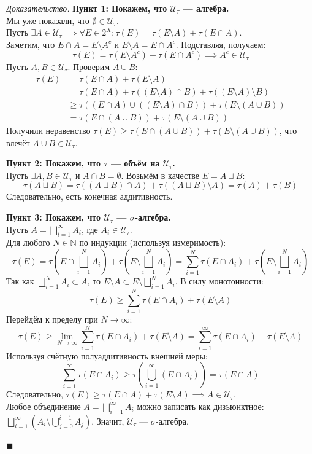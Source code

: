 \documentclass[12pt,a4paper]{article}
\newenvironment{Proof}[1][Доказательство]{\vspace{0.5em}\noindent\textit{#1.}\hspace{0.5em}\ignorespaces}{\hfill$\blacksquare$\vspace{1em}}
\begin{document}
\begin{Proof}
\textbf{Пункт 1: Покажем, что $\mathcal{U}_\tau$ — алгебра.} \\
Мы уже показали, что $\emptyset \in \mathcal{U}_\tau$. \\
Пусть $\exists A \in \mathcal{U}_\tau \implies \forall E \in 2^X: \tau(E) = \tau(E \setminus A) + \tau(E \cap A)$. \\
Заметим, что $E \cap A = E \setminus A^c$ и $E \setminus A = E \cap A^c$. Подставляя, получаем:
$$ \tau(E) = \tau(E \setminus A^c) + \tau(E \cap A^c) \implies A^c \in \mathcal{U}_\tau $$
Пусть $A, B \in \mathcal{U}_\tau$. Проверим $A \cup B$:
\begin{align*}
    \tau(E) &= \tau(E \cap A) + \tau(E \setminus A) \\
    &= \tau(E \cap A) + \tau((E \setminus A) \cap B) + \tau((E \setminus A) \setminus B) \\
    &\ge \tau((E \cap A) \cup ((E \setminus A) \cap B)) + \tau(E \setminus (A \cup B)) \\
    &= \tau(E \cap (A \cup B)) + \tau(E \setminus (A \cup B))
\end{align*}
Получили неравенство $\tau(E) \ge \tau(E \cap (A \cup B)) + \tau(E \setminus (A \cup B))$, что влечёт $A \cup B \in \mathcal{U}_\tau$.

\textbf{Пункт 2: Покажем, что $\tau$ — объём на $\mathcal{U}_\tau$.} \\
Пусть $\exists A, B \in \mathcal{U}_\tau$ и $A \cap B = \emptyset$. Возьмём в качестве $E = A \sqcup B$:
$$ \tau(A \sqcup B) = \tau((A \sqcup B) \cap A) + \tau((A \sqcup B) \setminus A) = \tau(A) + \tau(B) $$
Следовательно, есть конечная аддитивность.

\textbf{Пункт 3: Покажем, что $\mathcal{U}_\tau$ — $\sigma$-алгебра.} \\
Пусть $A = \bigsqcup\limits_{i=1}^{\infty} A_i$, где $A_i \in \mathcal{U}_\tau$. \\
Для любого $N \in \mathbb{N}$ по индукции (используя измеримость):
$$ \tau(E) = \tau \left( E \cap \bigsqcup\limits_{i=1}^N A_i \right) + \tau \left( E \setminus \bigsqcup\limits_{i=1}^N A_i \right) = \sum\limits_{i=1}^N \tau(E \cap A_i) + \tau \left( E \setminus \bigsqcup\limits_{i=1}^N A_i \right) $$
Так как $\bigsqcup\limits_{i=1}^N A_i \subset A$, то $E \setminus A \subset E \setminus \bigsqcup\limits_{i=1}^N A_i$. В силу монотонности:
$$ \tau(E) \ge \sum\limits_{i=1}^N \tau(E \cap A_i) + \tau(E \setminus A) $$
Перейдём к пределу при $N \to \infty$:
$$ \tau(E) \ge \lim\limits_{N \to \infty} \sum\limits_{i=1}^N \tau(E \cap A_i) + \tau(E \setminus A) = \sum\limits_{i=1}^{\infty} \tau(E \cap A_i) + \tau(E \setminus A) $$
Используя счётную полуаддитивность внешней меры:
$$ \sum\limits_{i=1}^{\infty} \tau(E \cap A_i) \ge \tau \left( \bigcup\limits_{i=1}^{\infty} (E \cap A_i) \right) = \tau(E \cap A) $$
Следовательно, $\tau(E) \ge \tau(E \cap A) + \tau(E \setminus A) \implies A \in \mathcal{U}_\tau$. \\
Любое объединение $A = \bigsqcup\limits_{i=1}^{\infty} A_i$ можно записать как дизъюнктное: $\bigsqcup\limits_{i=1}^{\infty} \left( A_i \setminus \bigcup\limits_{j=0}^{i-1} A_j \right)$. Значит, $\mathcal{U}_\tau$ — $\sigma$-алгебра.


\end{Proof}
\end{document}
